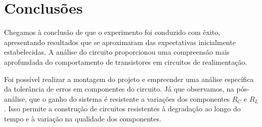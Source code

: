 \section{Conclusões}

Chegamos à conclusão de que o experimento foi conduzido com êxito, apresentando resultados que se aproximaram das expectativas inicialmente estabelecidas. A análise do circuito proporcionou uma compreensão mais aprofundada do comportamento de transistores em circuitos de realimentação.

Foi possível realizar a montagem do projeto e empreender uma análise específica da tolerância de erros em componentes do circuito. Já que observamos, na pós-análise, que o ganho do sistema é resistente a variações dos componentes $R_C$ e $R_L$. Isso permite a construção de circuitos resistentes à degradação ao longo do tempo e à variação na qualidade dos componentes.